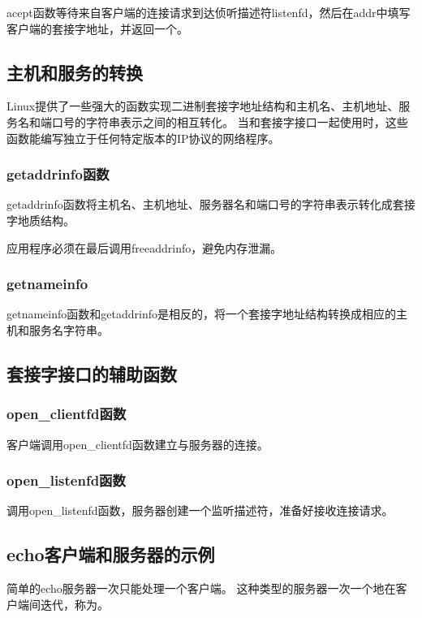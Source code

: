 {{        acept函数等待来自客户端的连接请求到达侦听描述符listenfd，然后在addr中填写客户端的套接字地址，并返回一个。
    }

    \subsection{主机和服务的转换}
    {
        Linux提供了一些强大的函数实现二进制套接字地址结构和主机名、主机地址、服务名和端口号的字符串表示之间的相互转化。
        当和套接字接口一起使用时，这些函数能编写独立于任何特定版本的IP协议的网络程序。

        \subsubsection{getaddrinfo函数}
        {
            getaddrinfo函数将主机名、主机地址、服务器名和端口号的字符串表示转化成套接字地质结构。

            应用程序必须在最后调用freeaddrinfo，避免内存泄漏。
        }

        \subsubsection{getnameinfo}
        {
            getnameinfo函数和getaddrinfo是相反的，将一个套接字地址结构转换成相应的主机和服务名字符串。
        }
    }

    \subsection{套接字接口的辅助函数}
    {
        \subsubsection{open\_clientfd函数}
        {
            客户端调用open\_clientfd函数建立与服务器的连接。
        }

        \subsubsection{open\_listenfd函数}
        {
            调用open\_listenfd函数，服务器创建一个监听描述符，准备好接收连接请求。
        }
    }

    \subsection{echo客户端和服务器的示例}
    {
        简单的echo服务器一次只能处理一个客户端。
        这种类型的服务器一次一个地在客户端间迭代，称为。
    }
}
